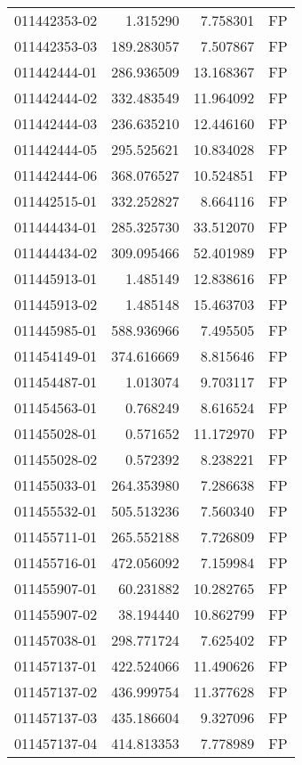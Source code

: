 \begin{tabular}{lrrl}
011442353-02 &    1.315290 &     7.758301 &   FP \\
011442353-03 &  189.283057 &     7.507867 &   FP \\
011442444-01 &  286.936509 &    13.168367 &   FP \\
011442444-02 &  332.483549 &    11.964092 &   FP \\
011442444-03 &  236.635210 &    12.446160 &   FP \\
011442444-05 &  295.525621 &    10.834028 &   FP \\
011442444-06 &  368.076527 &    10.524851 &   FP \\
011442515-01 &  332.252827 &     8.664116 &   FP \\
011444434-01 &  285.325730 &    33.512070 &   FP \\
011444434-02 &  309.095466 &    52.401989 &   FP \\
011445913-01 &    1.485149 &    12.838616 &   FP \\
011445913-02 &    1.485148 &    15.463703 &   FP \\
011445985-01 &  588.936966 &     7.495505 &   FP \\
011454149-01 &  374.616669 &     8.815646 &   FP \\
011454487-01 &    1.013074 &     9.703117 &   FP \\
011454563-01 &    0.768249 &     8.616524 &   FP \\
011455028-01 &    0.571652 &    11.172970 &   FP \\
011455028-02 &    0.572392 &     8.238221 &   FP \\
011455033-01 &  264.353980 &     7.286638 &   FP \\
011455532-01 &  505.513236 &     7.560340 &   FP \\
011455711-01 &  265.552188 &     7.726809 &   FP \\
011455716-01 &  472.056092 &     7.159984 &   FP \\
011455907-01 &   60.231882 &    10.282765 &   FP \\
011455907-02 &   38.194440 &    10.862799 &   FP \\
011457038-01 &  298.771724 &     7.625402 &   FP \\
011457137-01 &  422.524066 &    11.490626 &   FP \\
011457137-02 &  436.999754 &    11.377628 &   FP \\
011457137-03 &  435.186604 &     9.327096 &   FP \\
011457137-04 &  414.813353 &     7.778989 &   FP \\

\end{tabular}
